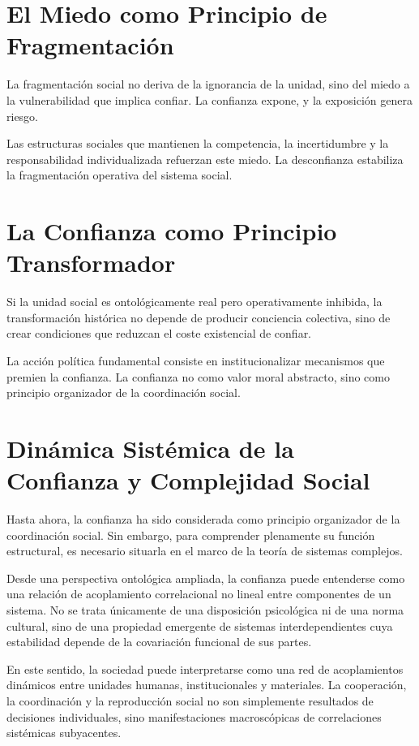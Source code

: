 \documentclass[12pt,a4paper]{article}
\begin{document}
\section{El Miedo como Principio de Fragmentación}

La fragmentación social no deriva de la ignorancia de la unidad, sino del miedo a la vulnerabilidad que implica confiar. La confianza expone, y la exposición genera riesgo.

Las estructuras sociales que mantienen la competencia, la incertidumbre y la responsabilidad individualizada refuerzan este miedo. La desconfianza estabiliza la fragmentación operativa del sistema social.

\section{La Confianza como Principio Transformador}

Si la unidad social es ontológicamente real pero operativamente inhibida, la transformación histórica no depende de producir conciencia colectiva, sino de crear condiciones que reduzcan el coste existencial de confiar.

La acción política fundamental consiste en institucionalizar mecanismos que premien la confianza. La confianza no como valor moral abstracto, sino como principio organizador de la coordinación social.

\section{Dinámica Sistémica de la Confianza y Complejidad Social}

Hasta ahora, la confianza ha sido considerada como principio organizador de la
coordinación social. Sin embargo, para comprender plenamente su función estructural,
es necesario situarla en el marco de la teoría de sistemas complejos.

Desde una perspectiva ontológica ampliada, la confianza puede entenderse como una
relación de acoplamiento correlacional no lineal entre componentes de un sistema.
No se trata únicamente de una disposición psicológica ni de una norma cultural,
sino de una propiedad emergente de sistemas interdependientes cuya estabilidad
depende de la covariación funcional de sus partes.

En este sentido, la sociedad puede interpretarse como una red de acoplamientos
dinámicos entre unidades humanas, institucionales y materiales. La cooperación,
la coordinación y la reproducción social no son simplemente resultados de decisiones
individuales, sino manifestaciones macroscópicas de correlaciones sistémicas
subyacentes.
\end{document}
